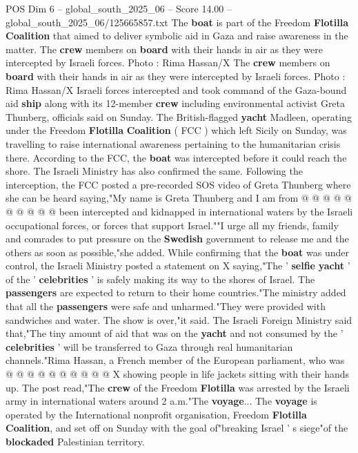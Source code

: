 \begin{textsample}{POS Dim 6 – global\_south\_2025\_06 – Score 14.00 – global\_south\_2025\_06/125665857.txt}  \label{ex:f6_pos_012}
The \textbf{boat} is part of the Freedom \textbf{Flotilla} \textbf{Coalition} that aimed to deliver symbolic aid in Gaza and raise awareness in the matter.
The \textbf{crew} members on \textbf{board} with their hands in air as they were intercepted by Israeli forces.
Photo : Rima Hassan/X The \textbf{crew} members on \textbf{board} with their hands in air as they were intercepted by Israeli forces.
Photo : Rima Hassan/X Israeli forces intercepted and took command of the Gaza-bound aid \textbf{ship} along with its 12-member \textbf{crew} including environmental activist Greta Thunberg, officials said on Sunday.
The British-flagged \textbf{yacht} Madleen, operating under the Freedom \textbf{Flotilla} \textbf{Coalition} ( FCC ) which left Sicily on Sunday, was travelling to raise international awareness pertaining to the humanitarian crisis there.
According to the FCC, the \textbf{boat} was intercepted before it could reach the shore.
The Israeli Ministry has also confirmed the same.
Following the interception, the FCC posted a pre-recorded SOS video of Greta Thunberg where she can be heard saying,"My name is Greta Thunberg and I am from @ @ @ @ @ @ @ @ @ @ been intercepted and kidnapped in international waters by the Israeli occupational forces, or forces that support Israel.""I urge all my friends, family and comrades to put pressure on the \textbf{Swedish} government to release me and the others as soon as possible,"she added.
While confirming that the \textbf{boat} was under control, the Israeli Ministry posted a statement on X saying,"The ' \textbf{selfie} \textbf{yacht} ' of the ' \textbf{celebrities} ' is safely making its way to the shores of Israel.
The \textbf{passengers} are expected to return to their home countries."The ministry added that all the \textbf{passengers} were safe and unharmed."They were provided with sandwiches and water.
The show is over,"it said.
The Israeli Foreign Ministry said that,"The tiny amount of aid that was on the \textbf{yacht} and not consumed by the ' \textbf{celebrities} ' will be transferred to Gaza through real humanitarian channels."Rima Hassan, a French member of the European parliament, who was @ @ @ @ @ @ @ @ @ @ X showing people in life jackets sitting with their hands up.
The post read,"The \textbf{crew} of the Freedom \textbf{Flotilla} was arrested by the Israeli army in international waters around 2 a.m."The \textbf{voyage}...
The \textbf{voyage} is operated by the International nonprofit organisation, Freedom \textbf{Flotilla} \textbf{Coalition}, and set off on Sunday with the goal of"breaking Israel ' s siege"of the \textbf{blockaded} Palestinian territory.

\end{textsample}
